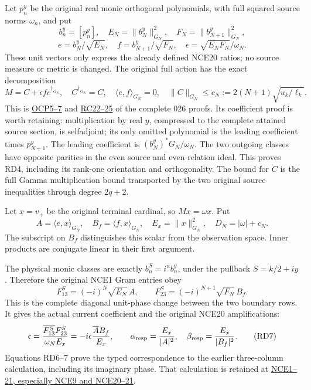\documentclass[10pt]{article}
\begin{document}
Let \(p_n^y\) be the original real monic orthogonal polynomials, with full squared source norms \(\omega_n\), and put \[
b_n^y=[p_n^y],\quad E_N=\|b_N^y\|_{G_N}^2,\quad
F_N=\|b_{N+1}^y\|_{G_N}^2,
\] \[
e=b_N^y/\sqrt{E_N},\quad f=b_{N+1}^y/\sqrt{F_N},\quad
\epsilon=\sqrt{E_NF_N}/\omega_N.
\tag{RD3}
\] These unit vectors only express the already defined NCE20 ratios; no source measure or metric is changed. The original full action has the exact decomposition \[
M=C+\epsilon f e^{\dagger_{G_N}},\quad C^{\dagger_{G_N}}=C,
\quad \langle e,f\rangle_{G_N}=0,
\quad \|C\|_{G_N}\le c_N:=2(N+1)\sqrt{u_k/\ell_k}.
\tag{RD4}
\] This is \href{https://github.com/KokunoYumeto/zeta-function-research-reader/blob/5c69161ca70ee187f41df0bfe786e8b6eebed422/workbenches/splitzero-tandem/continuations/20260922-current-effective-cutoff/OBSERVED_CURRENT_PLANE.tex\#L90}{OCP5--7} and \href{https://github.com/KokunoYumeto/zeta-function-research-reader/blob/5c69161ca70ee187f41df0bfe786e8b6eebed422/workbenches/splitzero-tandem/continuations/20260922-current-effective-cutoff/CUTOFF_CURRENT_CONNECTION.md\#L190}{RC22--25} of the complete 026 proofs. Its coefficient proof is worth retaining: multiplication by real \(y\), compressed to the complete attained source section, is selfadjoint; its only omitted polynomial is the leading coefficient times \(p_{N+1}^y\). The leading coefficient is \((b_N^y)^*G_N/\omega_N\). The two outgoing classes have opposite parities in the even source and even relation ideal. This proves RD4, including its rank-one orientation and orthogonality. The bound for \(C\) is the full Gamma multiplication bound transported by the two original source inequalities through degree \(2q+2\).

Let \(x=v_+\) be the original terminal cardinal, so \(Mx=\omega x\). Put \[
A=\langle e,x\rangle_{G_N},\quad B_f=\langle f,x\rangle_{G_N},
\quad E_x=\|x\|_{G_N}^2,
\quad D_N=|\omega|+c_N.
\tag{RD5}
\] The subscript on \(B_f\) distinguishes this scalar from the observation space. Inner products are conjugate linear in their first argument.

The physical monic classes are exactly \(b_n^S=i^n b_n^y\), under the pullback \(S=k/2+iy\). Therefore the original NCE1 Gram entries obey \[
F_{13}^{S}=(-i)^N\sqrt{E_N}\,A,\qquad
F_{23}^{S}=(-i)^{N+1}\sqrt{F_N}\,B_f.
\tag{RD6}
\] This is the complete diagonal unit-phase change between the two boundary rows. It gives the actual current coefficient and the original NCE20 amplifications: \[
\mathfrak c=\frac{\overline{F_{13}^{S}}F_{23}^{S}}{\omega_NE_x}
=-i\epsilon\frac{\overline A B_f}{E_x},\qquad
\alpha_{\rm resp}=\frac{E_x}{|A|^2},\quad
\beta_{\rm resp}=\frac{E_x}{|B_f|^2}.
\tag{RD7}
\] Equations RD6--7 prove the typed correspondence to the earlier three-column calculation, including its imaginary phase. That calculation is retained at \href{https://github.com/KokunoYumeto/zeta-function-research-reader/blob/6cf5b3aa8ff395eba6b5512b28d117334da5767b/workbenches/splitzero-tandem/continuations/20260922-cutoff-profile/RETAINED_COMPLETE_PROOF_SOURCES.tex\#L109583}{NCE1--21, especially NCE9 and NCE20--21}.
\end{document}
